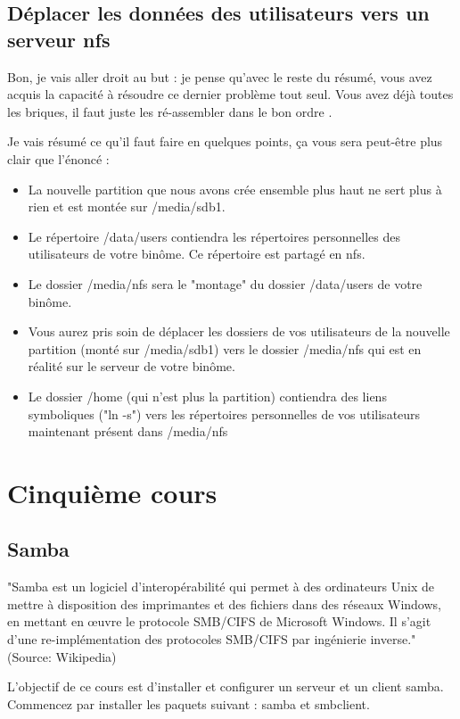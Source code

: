 \documentclass[a4paper,11pt]{article}
\begin{document}
\subsection{Déplacer les données des utilisateurs vers un serveur nfs}
\par Bon, je vais aller droit au but : je pense qu'avec le reste du résumé, vous avez acquis la capacité à résoudre ce dernier problème tout seul. Vous avez déjà toutes les briques, il faut juste les ré-assembler dans le bon ordre%
.
\par Je vais résumé ce qu'il faut faire en quelques points, ça vous sera peut-être plus clair que l'énoncé :
\begin{itemize}
\item La nouvelle partition que nous avons crée ensemble plus haut ne sert plus à rien et est montée sur /media/sdb1. 
\item Le répertoire /data/users contiendra les répertoires personnelles des utilisateurs de votre binôme. Ce répertoire est partagé en nfs.
\item Le dossier /media/nfs sera le "montage" du dossier /data/users de votre binôme.
\item Vous aurez pris soin de déplacer les dossiers de vos utilisateurs de la nouvelle partition (monté sur /media/sdb1) vers le dossier /media/nfs qui est en réalité sur le serveur de votre binôme.
\item Le dossier /home (qui n'est plus la partition) contiendra des liens symboliques ("ln -s") vers les répertoires personnelles de vos utilisateurs maintenant présent dans /media/nfs
\end{itemize}

\section{Cinquième cours}
\subsection{Samba}
\par "Samba est un logiciel d'interopérabilité qui permet à des ordinateurs Unix de mettre à disposition des imprimantes et des fichiers dans des réseaux Windows, en mettant en œuvre le protocole SMB/CIFS de Microsoft Windows. Il s'agit d'une re-implémentation des protocoles SMB/CIFS par ingénierie inverse." (Source: Wikipedia)
\par L'objectif de ce cours est d'installer et configurer un serveur et un client samba. Commencez par installer les paquets suivant : samba et smbclient.
\end{document}
